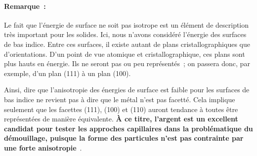 \paragraph*{Remarque~:} Le fait que l'énergie de surface ne soit pas isotrope est un élément de description très important pour les solides. Ici, nous n'avons considéré l'énergie des surfaces de bas indice. Entre ces surfaces, il existe autant de plans cristallographiques que d'orientations. D'un point de vue atomique et cristallographique, ces plans sont plus hauts en énergie. Ils ne seront pas ou peu représentés~; on passera donc, par exemple, d'un plan (111) à un plan (100).\par 
Ainsi, dire que l'anisotropie des énergies de surface est faible pour les surfaces de bas indice ne revient pas à dire que le métal n'est pas facetté. Cela implique seulement que les facettes (111), (100) et (110) auront tendance à toutes être représentées de manière équivalente. \textbf{À ce titre, l'argent est un excellent candidat pour tester les approches capillaires dans la problématique du démouillage, puisque la forme des particules n'est pas contrainte par une forte anisotropie}~\cite{brandon1966mobility}.\par 


